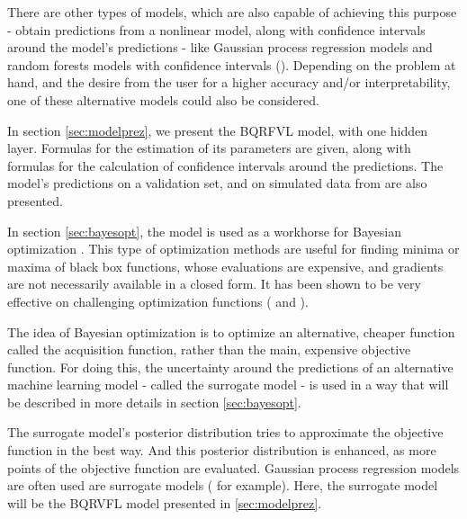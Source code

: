 \medskip 

There are other types of models, which are also capable of achieving this purpose - obtain predictions from a nonlinear model, along with confidence intervals around the model's predictions - like Gaussian process regression models \cite{rasmussen2006gaussian} and random forests models with confidence intervals (\cite{wager2014confidence}). Depending on the problem at hand, and the desire from the user for a higher  accuracy and/or interpretability, one of these alternative models could also be considered.    

\medskip 

In section \ref{sec:modelprez}, we present the BQRFVL model, with one hidden layer. Formulas for the estimation of its parameters are given, along with formulas for the calculation of confidence intervals around the predictions. The model's predictions on a validation set, and on simulated data from \cite{sapp2014subsemble} are also presented. 

\medskip 

In section \ref{sec:bayesopt}, the model is used as a workhorse for Bayesian optimization \cite{mockus1978toward}. This type of optimization methods are useful for finding minima or maxima of black box functions, whose evaluations are expensive, and gradients are not necessarily available in a closed form. It has been shown to be very effective on challenging optimization functions (\cite{jones2001taxonomy} and \cite{snoek2012practical}).

\medskip 

The idea of Bayesian optimization is to optimize an alternative, cheaper function called the acquisition function, rather than the main, expensive objective function. For doing this, the uncertainty around the predictions of an alternative machine learning model - called the surrogate model - is used in a way that will be described in more details in section \ref{sec:bayesopt}. 

\medskip 

The surrogate model's posterior distribution tries to approximate the objective function in the best way. And this posterior distribution is enhanced, as more points of the objective function are evaluated. Gaussian process regression models are often used are surrogate models (\cite{snoek2012practical} for example). Here, the surrogate model will be the BQRVFL model presented in \ref{sec:modelprez}.

\medskip 

